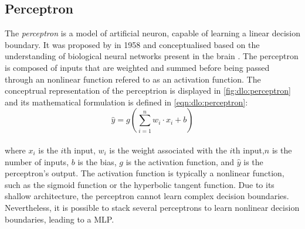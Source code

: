 \subsection{Perceptron}\label{sec:dlo:perceptron}

The \emph{perceptron} is a model of artificial neuron, capable of learning a
linear decision boundary. It was proposed by
\citeauthor{rosenblatt1958perceptron} in 1958 \cite{rosenblatt1958perceptron}
and conceptualised based on the understanding of biological neural networks
present in the brain \cite{mcculloch1943logical,hebb2005organization}. The
perceptron is composed of inputs that are weighted and summed before being
passed through an nonlinear function refered to as an activation function. The
conceptrual representation of the perceptrion is displayed in
\cref{fig:dlo:perceptron} and its mathematical formulation is defined in
\cref{eqn:dlo:perceptron}: \\

\begin{equation}
  \label{eqn:dlo:perceptron}
\hat{y} = g(\sum_{i=1}^{n} w_i \cdot x_i + b)
\end{equation} \\



\noindent where $x_i$ is the $i$th input, $w_i$ is the weight associated with
the $i$th input,$n$ is the number of inputs, $b$ is the bias, $g$ is the
activation function, and $\hat{y}$ is the perceptron's output. The activation
function is typically a nonlinear function, such as the sigmoid function or the
hyperbolic tangent function. Due to its shallow architecture, the perceptron
cannot learn complex decision boundaries. Nevertheless, it is possible to stack
several perceptrons to learn nonlinear decision boundaries, leading to a
\acl{MLP}.\\

